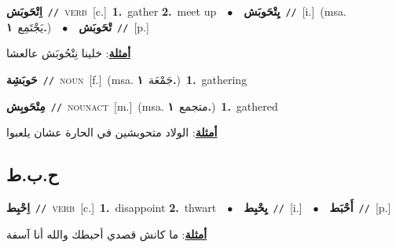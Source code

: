 \documentclass[10pt,a4paper,twoside]{article} %
\begin{document}
\begin{multicols}{2}
{{{{{\setlength\topsep{0pt}\textbf{\foreignlanguage{arabic}{اِتْحَوبَش}}\ {\color{gray}\texttt{//}\color{black}}\ \textsc{verb}\ [c.]\ \textbf{1.}~gather  \textbf{2.}~meet up\ \ $\bullet$\ \ \setlength\topsep{0pt}\textbf{\foreignlanguage{arabic}{يِتْحَوبَش}}\ {\color{gray}\texttt{//}\color{black}}\ [i.]\ \color{gray}(msa. \foreignlanguage{arabic}{يَجْتَمِع}~\foreignlanguage{arabic}{\textbf{١.}})\color{black}\ \ $\bullet$\ \ \setlength\topsep{0pt}\textbf{\foreignlanguage{arabic}{تْحَوبَش}}\ {\color{gray}\texttt{//}\color{black}}\ [p.]\  \begin{flushright}\color{gray}\foreignlanguage{arabic}{\textbf{\underline{\foreignlanguage{arabic}{أمثلة}}}: خلينا نِتْحُوبَش عالعشا}\end{flushright}\color{black}} \vspace{2mm}

{\setlength\topsep{0pt}\textbf{\foreignlanguage{arabic}{حَوبَشِة}}\ {\color{gray}\texttt{//}\color{black}}\ \textsc{noun}\ [f.]\ \color{gray}(msa. \foreignlanguage{arabic}{جَمْعَة}~\foreignlanguage{arabic}{\textbf{١.}})\color{black}\ \textbf{1.}~gathering\ 

{\setlength\topsep{0pt}\textbf{\foreignlanguage{arabic}{مِتْحَوبِش}}\ {\color{gray}\texttt{//}\color{black}}\ \textsc{noun\textunderscore act}\ [m.]\ \color{gray}(msa. \foreignlanguage{arabic}{متجمع}~\foreignlanguage{arabic}{\textbf{١.}})\color{black}\ \textbf{1.}~gathered\  \begin{flushright}\color{gray}\foreignlanguage{arabic}{\textbf{\underline{\foreignlanguage{arabic}{أمثلة}}}: الولاد متحوبشين في الحارة عشان يلعبوا}\end{flushright}\color{black}} \vspace{2mm}

\vspace{-3mm}
\subsection*{\color{blue}\foreignlanguage{arabic}{ح.ب.ط}\color{blue}{}} 

{\setlength\topsep{0pt}\textbf{\foreignlanguage{arabic}{اِحْبِط}}\ {\color{gray}\texttt{//}\color{black}}\ \textsc{verb}\ [c.]\ \textbf{1.}~disappoint  \textbf{2.}~thwart\ \ $\bullet$\ \ \setlength\topsep{0pt}\textbf{\foreignlanguage{arabic}{يِحْبِط}}\ {\color{gray}\texttt{//}\color{black}}\ [i.]\ \ $\bullet$\ \ \setlength\topsep{0pt}\textbf{\foreignlanguage{arabic}{أَحْبَط}}\ {\color{gray}\texttt{//}\color{black}}\ [p.]\  \begin{flushright}\color{gray}\foreignlanguage{arabic}{\textbf{\underline{\foreignlanguage{arabic}{أمثلة}}}: ما كانش قصدي أحبطك والله أنا آسفة}\end{flushright}\color{black}} \vspace{2mm}

}}}}}
\end{multicols}
\end{document}
